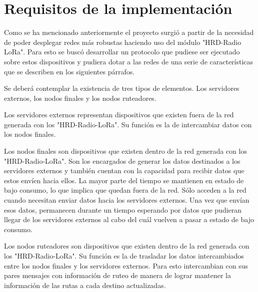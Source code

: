 \section{Requisitos de la implementación}

Como se ha mencionado anteriormente el proyecto surgió a partir de la necesidad de poder desplegar redes más robustas haciendo uso del módulo "HRD-Radio LoRa". Para esto se buscó desarrollar un protocolo que pudiese ser ejecutado sobre estos dispositivos y pudiera dotar a las redes de una serie de características que se describen en los siguientes párrafos.

Se deberá contemplar la existencia de tres tipos de elementos. Los servidores externos, los nodos finales y los nodos ruteadores.

Los servidores externos representan dispositivos que existen fuera de la red generada con los "HRD-Radio-LoRa". Su función es la de intercambiar datos con los nodos finales.

Los nodos finales son dispositivos que existen dentro de la red generada con los "HRD-Radio-LoRa". Son los encargados de generar los datos destinados a los servidores externos y también cuentan con la capacidad para recibir datos que estos envíen hacia ellos. La mayor parte del tiempo se mantienen en estado de bajo consumo, lo que implica que quedan fuera de la red. Sólo acceden a la red cuando necesitan enviar datos hacia los servidores externos. Una vez que envían esos datos, permanecen durante un tiempo esperando por datos que pudieran llegar de los servidores externos al cabo del cuál vuelven a pasar a estado de bajo consumo.

Los nodos ruteadores son dispositivos que existen dentro de la red generada con los "HRD-Radio-LoRa". Su función es la de trasladar los datos intercambiados entre los nodos finales y los servidores externos. Para esto intercambian con sus pares mensajes con información de ruteo de manera de lograr mantener la información de las rutas a cada destino actualizadas.




